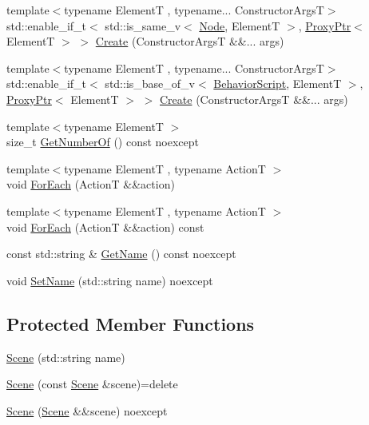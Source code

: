 \begin{DoxyCompactItemize}
\item 
{\footnotesize template$<$typename ElementT , typename... Constructor\+ArgsT$>$ }\\std\+::enable\+\_\+if\+\_\+t$<$ std\+::is\+\_\+same\+\_\+v$<$ \mbox{\hyperlink{classmage_1_1_node}{Node}}, ElementT $>$, \mbox{\hyperlink{classmage_1_1_proxy_ptr}{Proxy\+Ptr}}$<$ ElementT $>$ $>$ \mbox{\hyperlink{classmage_1_1_scene_a8ce3f5152ad4b0935a08cc2f0a53383c}{Create}} (Constructor\+ArgsT \&\&... args)
\item 
{\footnotesize template$<$typename ElementT , typename... Constructor\+ArgsT$>$ }\\std\+::enable\+\_\+if\+\_\+t$<$ std\+::is\+\_\+base\+\_\+of\+\_\+v$<$ \mbox{\hyperlink{classmage_1_1_behavior_script}{Behavior\+Script}}, ElementT $>$, \mbox{\hyperlink{classmage_1_1_proxy_ptr}{Proxy\+Ptr}}$<$ ElementT $>$ $>$ \mbox{\hyperlink{classmage_1_1_scene_ab135fe20ddadf6c1e2820a9582a31e64}{Create}} (Constructor\+ArgsT \&\&... args)
\item 
{\footnotesize template$<$typename ElementT $>$ }\\size\+\_\+t \mbox{\hyperlink{classmage_1_1_scene_a308480749d009dad3a39333fd0c59f2a}{Get\+Number\+Of}} () const noexcept
\item 
{\footnotesize template$<$typename ElementT , typename ActionT $>$ }\\void \mbox{\hyperlink{classmage_1_1_scene_a8bb2cd615a6c500677d4816fceb8cce3}{For\+Each}} (ActionT \&\&action)
\item 
{\footnotesize template$<$typename ElementT , typename ActionT $>$ }\\void \mbox{\hyperlink{classmage_1_1_scene_ac71dc52550c59256c30537b8dc9ca720}{For\+Each}} (ActionT \&\&action) const
\item 
const std\+::string \& \mbox{\hyperlink{classmage_1_1_scene_a4ba4e45e54935fddd63638664e7b0f2e}{Get\+Name}} () const noexcept
\item 
void \mbox{\hyperlink{classmage_1_1_scene_a97a8efab5b4aa9f78b451ea2c68b300e}{Set\+Name}} (std\+::string name) noexcept
\end{DoxyCompactItemize}
\subsection*{Protected Member Functions}
\begin{DoxyCompactItemize}
\item 
\mbox{\hyperlink{classmage_1_1_scene_a3434f00f7b9552cfd7a9f073290830cb}{Scene}} (std\+::string name)
\item 
\mbox{\hyperlink{classmage_1_1_scene_a88d83ccb2e10549d5370f850b2b4c228}{Scene}} (const \mbox{\hyperlink{classmage_1_1_scene}{Scene}} \&scene)=delete
\item 
\mbox{\hyperlink{classmage_1_1_scene_afeae10a3a50bf1d624faa6bd0bf33a7d}{Scene}} (\mbox{\hyperlink{classmage_1_1_scene}{Scene}} \&\&scene) noexcept
\end{DoxyCompactItemize}

